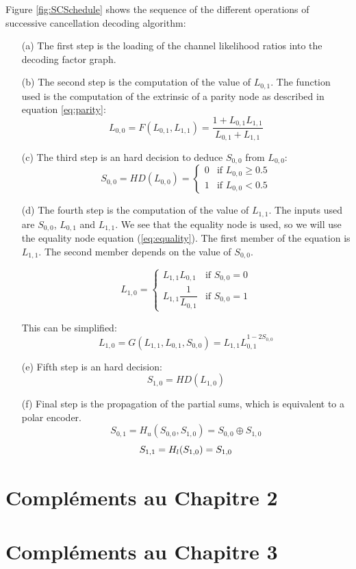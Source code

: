 Figure \ref{fig:SCSchedule} shows the sequence of the different operations of successive cancellation decoding algorithm:
\begin{itemize}
\item[(a)] The first step is the loading of the channel likelihood ratios into the decoding factor graph.
\item[(b)] The second step is the computation of the value of $L_{0,1}$. The function used is the computation of the extrinsic of a parity node as described in equation \ref{eq:parity}:
\begin{equation}
L_{0,0} = F(L_{0,1}, L_{1,1}) = \dfrac{1+L_{0,1}L_{1,1}}{L_{0,1}+L_{1,1}}
\end{equation}
\item[(c)] The third step is an hard decision to deduce $S_{0,0}$ from $L_{0,0}$:
 \[
    S_{0,0}=HD(L_{0,0})=
    	\begin{cases} 
    		0 & \text{if }L_{0,0}\geq0.5\\
    		1 & \text{if }L_{0,0}<0.5
    		\end{cases}
  \]
\item[(d)] The fourth step is the computation of the value of $L_{1,1}$. The inputs used are $S_{0,0}$, $L_{0,1}$ and $L_{1,1}$. We see that the equality node is used, so we will use the equality node equation (\ref{eq:equality}). The first member of the equation is $L_{1,1}$. The second member depends on the value of $S_{0,0}$.

\[
	L_{1,0} = 
	\begin{cases} 
	L_{1,1}L_{0,1} & \text{if }S_{0,0} = 0\\
	L_{1,1}\dfrac{1}{L_{0,1}} & \text{if }S_{0,0} = 1
	\end{cases}
\]

This can be simplified:
\begin{equation}
L_{1,0} = G(L_{1,1},L_{0,1},S_{0,0}) = L_{1,1}L_{0,1}^{1 - 2S_{0,0}}
\end{equation}
\item[(e)] Fifth step is an hard decision: 
\begin{equation*}
S_{1,0}=HD(L_{1,0})
\end{equation*}
\item[(f)] Final step is the propagation of the partial sums, which is equivalent to a polar encoder.
\begin{equation}
S_{0,1} = H_u(S_{0,0},S_{1,0}) =S_{0,0}\oplus S_{1,0}
\end{equation}	
\begin{equation}
S_{1,1} = H_l(S_{1,0}) = S_{1,0}\\
\end{equation}

	
\end{itemize}

\chapter{Compléments au Chapitre 2}\label{sec:annCCSDS}
\chapter{Compléments au Chapitre 3}\label{sec:ann3}
